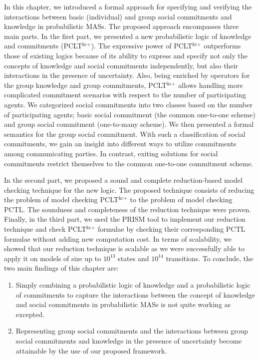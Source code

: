 In this chapter, we introduced a formal approach for specifying and
verifying the interactions between basic (individual) and group social commitments and knowledge in probabilistic MASs. The
proposed approach encompasses three main parts. In the first
part, we presented a new probabilistic logic of knowledge and
commitments (PCLT$^{\textrm{kc+}}$). The expressive power of
PCLT$^{\textrm{kc+}}$ outperforms those of existing logics because
of its ability to express and specify not only the concepts of
knowledge and social commitments independently, but also their
interactions in the presence of uncertainty. Also, being enriched
by operators for the group knowledge and group commitments,
PCLT$^{\textrm{kc+}}$ allows handling more complicated commitment
scenarios with respect to the number of participating agents. We
categorized social commitments into two classes based on the
number of participating agents; basic social commitment (the
common one-to-one scheme) and group social commitment (one-to-many
scheme). We then presented a formal semantics for the group social
commitment. With such a classification of social commitments, we
gain an insight into different ways to utilize commitments among
communicating parties. In contrast, exiting solutions for social commitments restrict themselves to the common one-to-one commitment scheme.

In the second part, we proposed a sound and complete reduction-based model checking technique for the new logic. The proposed technique consists of reducing the problem of model checking PCLT$^{\textrm{kc+}}$ to the problem of model checking PCTL. The soundness and completeness of the reduction technique were proven. Finally, in the third part, we used the
PRISM tool to implement our reduction technique and check
PCLT$^{\textrm{kc+}}$ formulae by checking their corresponding
PCTL formulae without adding new computation cost. In terms of scalability, we showed that our reduction technique is scalable as we were
successfully able to apply it on models of size up to $10^{13}$
states and $10^{14}$ transitions. To conclude, the two main findings of this chapter are:
 \begin{enumerate}
 \item Simply combining a probabilistic logic of knowledge and a probabilistic logic of commitments to capture the interactions between the concept of knowledge and social commitments in probabilistic MASs is not quite working as excepted.
 \item Representing group social commitments and the interactions between group social commitments and knowledge in the presence of uncertainty become attainable by the use of our proposed framework.
 \end{enumerate}

